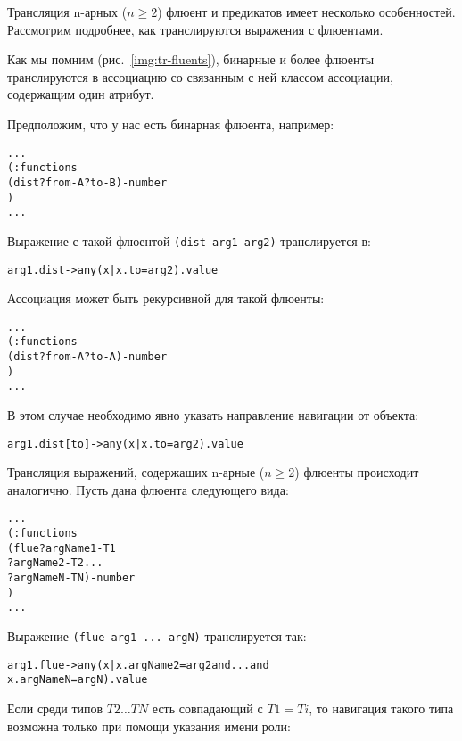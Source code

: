 Трансляция n-арных ($n \geq 2$) флюент и предикатов имеет несколько особенностей. Рассмотрим подробнее, как транслируются выражения с флюентами.

Как мы помним (рис.~\ref{img:tr-fluents}), бинарные и более флюенты транслируются в ассоциацию со связанным с ней классом ассоциации, содержащим один атрибут.

Предположим, что у нас есть бинарная флюента, например:
\begin{mdframed}[style=excode]
\begin{alltt}
  ...
  (:functions
    (dist ?from - A ?to - B) - number
  )
  ...
\end{alltt}
\end{mdframed}

Выражение с такой флюентой \texttt{(dist arg1 arg2)} транслируется в:
\begin{alltt}
arg1.dist->any(x | x.to = arg2).value
\end{alltt}

Ассоциация может быть рекурсивной для такой флюенты:
\begin{mdframed}[style=excode]
\begin{alltt}
  ...
  (:functions
    (dist ?from - A ?to - A) - number
  )
  ...
\end{alltt}
\end{mdframed}

В этом случае необходимо явно указать направление навигации от объекта:
\begin{alltt}
arg1.dist[to]->any(x | x.to = arg2).value
\end{alltt}

Трансляция выражений, содержащих n-арные ($n \ge 2$) флюенты происходит аналогично. Пусть дана флюента следующего вида:
\begin{mdframed}[style=excode]
\begin{alltt}
  ...
  (:functions
    (flue ?argName1 - T1 
          ?argName2 - T2 ... 
          ?argNameN - TN) - number
  )
  ...
\end{alltt}
\end{mdframed}

Выражение \texttt{(flue arg1 ... argN)} транслируется так:

\begin{alltt}
arg1.flue->any(x | x.argName2 = arg2 and ... and
                   x.argNameN = argN).value
\end{alltt}

Если среди типов $T2 \ldots TN$ есть совпадающий с $T1 = Ti$, то навигация 
такого типа возможна только при помощи указания имени роли:


